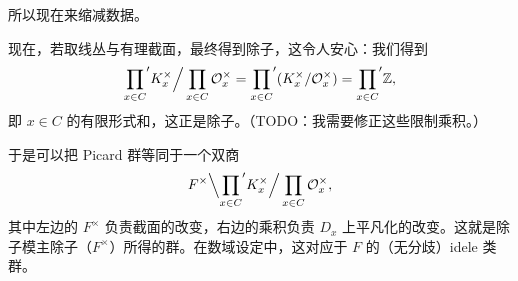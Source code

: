 所以现在来缩减数据。

现在，若取线丛与有理截面，最终得到除子，这令人安心：我们得到
\[
  {\prod_{x\in C}}' K_x^\times \Big/ \prod_{x\in C}\mathcal{O}_x^\times
  = {\prod_{x\in C}}'(K_x^\times/\mathcal{O}_x^\times)
  = {\prod_{x\in C}}' \mathbb{Z},
\]
即 $x\in C$ 的有限形式和，这正是除子。（TODO：我需要修正这些限制乘积。）

于是可以把 Picard 群等同于一个双商
\[
  F^\times \Big\backslash {\prod_{x\in C}}' K_x^\times \Big/ \prod_{x\in C}\mathcal{O}_x^\times,
\]
其中左边的 $F^\times$ 负责截面的改变，右边的乘积负责 $D_x$ 上平凡化的改变。这就是除子模主除子（$F^\times$）所得的群。在数域设定中，这对应于 $F$ 的（无分歧）idele 类群。
